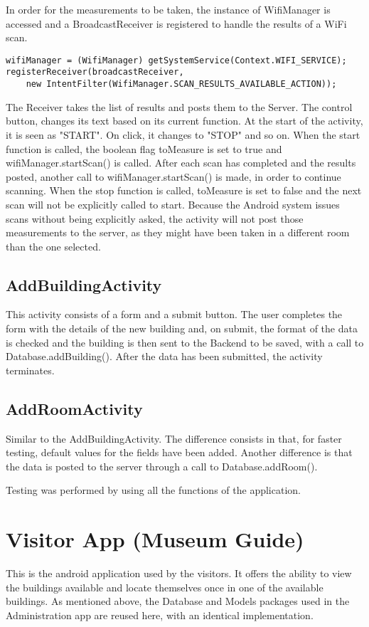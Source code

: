 In order for the measurements to be taken, the instance of WifiManager is accessed and a BroadcastReceiver is registered to handle the results of a WiFi scan.
\begin{lstlisting}
wifiManager = (WifiManager) getSystemService(Context.WIFI_SERVICE);
registerReceiver(broadcastReceiver, 
	new IntentFilter(WifiManager.SCAN_RESULTS_AVAILABLE_ACTION));
\end{lstlisting}
The Receiver takes the list of results and posts them to the Server. The control button, changes its text based on its current function. At the start of the activity, it is seen as "START". On click, it changes to "STOP" and so on. When the start function is called,  the boolean flag toMeasure is set to true and wifiManager.startScan() is called. After each scan has completed and the results posted, another call to wifiManager.startScan() is made, in order to continue scanning. When the stop function is called, toMeasure is set to false and the next scan will not be explicitly called to start. Because the Android system issues scans without being explicitly asked, the activity will not post those measurements to the server, as they might have been taken in a different room than the one selected. 
\subsection{AddBuildingActivity}
This activity consists of a form and a submit button. The user completes the form with the details of the new building and, on submit, the format of the data is checked and the building is then sent to the Backend to be saved, with a call to Database.addBuilding(). After the data has been submitted, the activity terminates. 

\subsection{AddRoomActivity}
Similar to the AddBuildingActivity. The difference consists in that, for faster testing, default values for the fields have been added. Another difference is that the data is posted to the server through a call to Database.addRoom(). 

Testing was performed by using all the functions of the application.
\section{Visitor App (Museum Guide)}
This is the android application used by the visitors. It offers the ability to view the buildings available and locate themselves once in one of the available buildings. As mentioned above, the Database and Models packages used in the Administration app are reused here, with an identical implementation.

